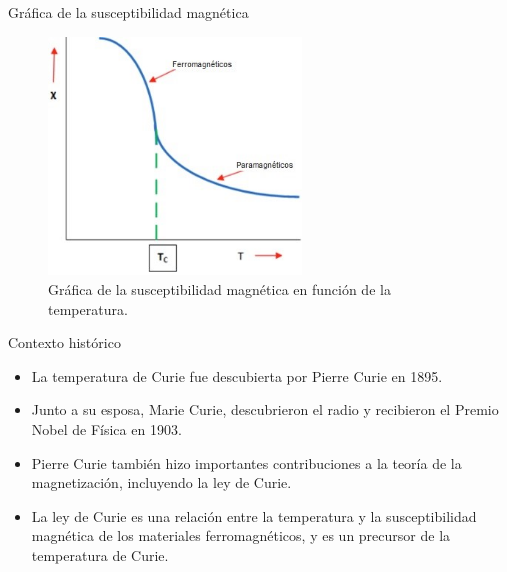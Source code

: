 \documentclass{beamer}
\begin{document}
\begin{frame}{Gráfica de la susceptibilidad magnética}
    \begin{figure}[h]
        \centering
        \includegraphics[width=0.6\textwidth]{curie-graph.jpg}
        \caption{Gráfica de la susceptibilidad magnética en función de la temperatura.}
        \label{fig:curie-graph}
    \end{figure}
\end{frame}

\begin{frame}{Contexto histórico}
    \begin{itemize}
        \item La temperatura de Curie fue descubierta por Pierre Curie en 1895.
        \item Junto a su esposa, Marie Curie, descubrieron el radio y recibieron el Premio Nobel de Física en 1903.
        \item Pierre Curie también hizo importantes contribuciones a la teoría de la magnetización, incluyendo la ley de Curie.
        \item La ley de Curie es una relación entre la temperatura y la susceptibilidad magnética de los materiales ferromagnéticos, y es un precursor de la temperatura de Curie.
    \end{itemize}
\end{frame}
\end{document}
